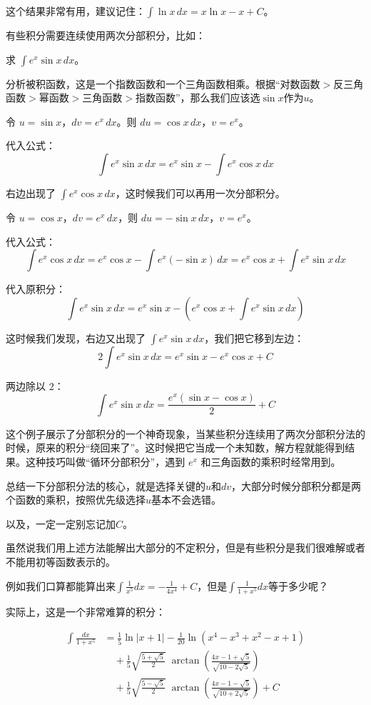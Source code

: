   这个结果非常有用，建议记住：$\int \ln x\, dx = x\ln x - x + C$。
  
  有些积分需要连续使用两次分部积分，比如：

\begin{myexample}
  求 $\int e^x \sin x\, dx$。

  分析被积函数，这是一个指数函数和一个三角函数相乘。根据“对数函数$>$反三角函数$>$幂函数$>$三角函数$>$指数函数”，那么我们应该选$\sin x$作为$u$。

  令 $u = \sin x$，$dv = e^x\, dx$。则 $du = \cos x\, dx$，$v = e^x$。

  代入公式：
  \[
  \int e^x \sin x\, dx = e^x \sin x - \int e^x \cos x\, dx
  \]

  右边出现了 $\int e^x \cos x\, dx$，这时候我们可以再用一次分部积分。
  
  令 $u = \cos x$，$dv = e^x\, dx$，则 $du = -\sin x\, dx$，$v = e^x$。
  
  代入公式：
  \[
  \int e^x \cos x\, dx = e^x \cos x - \int e^x (-\sin x)\, dx = e^x \cos x + \int e^x \sin x\, dx
  \]

  代入原积分：
  \[
  \int e^x \sin x\, dx = e^x \sin x - (e^x \cos x + \int e^x \sin x\, dx)
  \]

  这时候我们发现，右边又出现了 $\int e^x \sin x\, dx$，我们把它移到左边：
  \[
  2\int e^x \sin x\, dx = e^x \sin x - e^x \cos x + C
  \]

  两边除以 $2$：
  \[
  \int e^x \sin x\, dx = \frac{e^x(\sin x - \cos x)}{2} + C
  \]
\end{myexample}

这个例子展示了分部积分的一个神奇现象，当某些积分连续用了两次分部积分法的时候，原来的积分“绕回来了”。这时候把它当成一个未知数，解方程就能得到结果。这种技巧叫做“循环分部积分”，遇到 $e^x$ 和三角函数的乘积时经常用到。

总结一下分部积分法的核心，就是选择关键的$u$和$dv$，大部分时候分部积分都是两个函数的乘积，按照优先级选择$u$基本不会选错。

以及，一定一定别忘记加$C$。

虽然说我们用上述方法能解出大部分的不定积分，但是有些积分是我们很难解或者不能用初等函数表示的。

例如我们口算都能算出来\(\int \frac{1}{x^5} dx=-\frac{1}{4x^4}+C\)，但是\(\int \frac{1}{1+x^5}dx\)等于多少呢？

实际上，这是一个非常难算的积分：

\[
\begin{aligned}
\int \frac{dx}{1+x^5} 
&= \frac{1}{5}\ln|x+1| 
- \frac{1}{20}\ln\!(x^4 - x^3 + x^2 - x + 1) \\[4pt]
&\quad + \frac{1}{5}\sqrt{\frac{5+\sqrt{5}}{2}}\;
\arctan\!(\frac{4x - 1 + \sqrt{5}}{\sqrt{10 - 2\sqrt{5}}}) \\[4pt]
&\quad + \frac{1}{5}\sqrt{\frac{5-\sqrt{5}}{2}}\;
\arctan\!(\frac{4x - 1 - \sqrt{5}}{\sqrt{10 + 2\sqrt{5}}}) + C
\end{aligned}
\]

